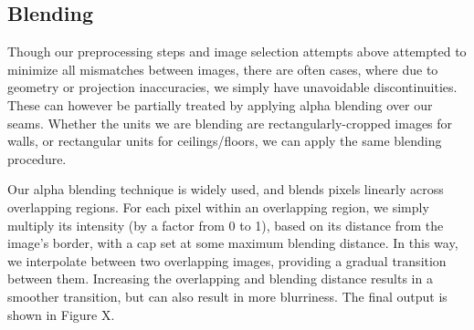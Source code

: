 \documentclass[10pt,twocolumn,letterpaper]{article}
\begin{document}
\subsection{Blending}
Though our preprocessing steps and image selection attempts above
attempted to minimize all mismatches between images, there are often
cases, where due to geometry or projection inaccuracies, we simply
have unavoidable discontinuities. These can however be partially
treated by applying alpha blending over our seams.  Whether the units
we are blending are rectangularly-cropped images for walls, or
rectangular units for ceilings/floors, we can apply the same blending
procedure.

Our alpha blending technique is widely used, and blends pixels
linearly across overlapping regions. For each pixel within an
overlapping region, we simply multiply its intensity (by a factor from 0 to
1), based on its distance from the image's border, with a cap set at some maximum blending distance. In this way, we
interpolate between two overlapping images, providing a gradual
transition between them. Increasing the overlapping and blending distance
results in a smoother transition, but can also result in more
blurriness. The final output is shown in Figure X.


{\small   }
\end{document}
